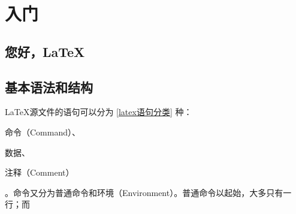 \chapter{入门}

\section{您好，\LaTeX }

\section{基本语法和结构}

\LaTeX 源文件的语句可以分为 \ref{latex语句分类} 种：\begin{inparaenum}\item 命令（Command）、 \item 数据、 \item  注释（Comment） \label{latex语句分类}\end{inparaenum}。命令又分为普通命令和环境（Environment）。普通命令以\doubleQuote{\textbackslash}起始，大多只有一行；而

